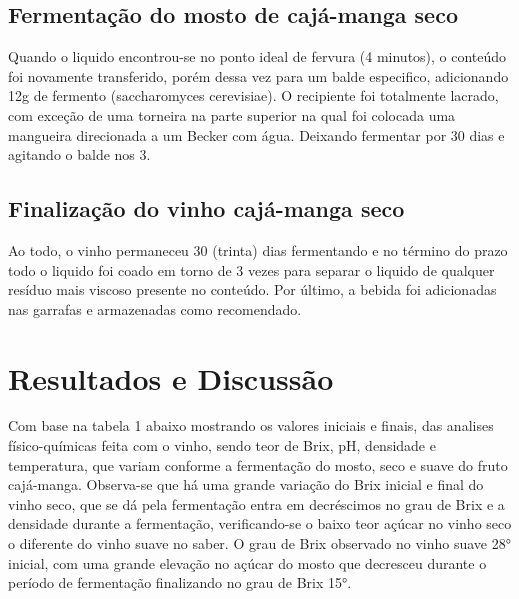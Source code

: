 \documentclass[article,12pt,onesidea,4paper,english,brazil]{abntex2}
\begin{document}
	\subsection*{Fermentação do mosto de cajá-manga seco}
	
	Quando o liquido encontrou-se no ponto ideal de fervura (4 minutos), o conteúdo foi novamente transferido, porém dessa vez para um balde especifico, adicionando 12g de fermento (saccharomyces cerevisiae). O recipiente foi totalmente lacrado, com exceção de uma torneira na parte superior na qual foi colocada uma mangueira direcionada a um Becker com água. Deixando fermentar por 30 dias e agitando o balde nos 3.
	
	\subsection*{Finalização do vinho cajá-manga seco}
	
	Ao todo, o vinho permaneceu 30 (trinta) dias fermentando e no término do prazo todo o liquido foi coado em torno de 3 vezes para separar o liquido de qualquer resíduo mais viscoso presente no conteúdo. Por último, a bebida foi adicionadas nas garrafas e armazenadas como recomendado.
	
	\section*{Resultados e Discussão}
	
Com base na tabela 1 abaixo mostrando os valores iniciais e finais, das analises físico-químicas feita com o vinho, sendo teor de Brix, pH, densidade e temperatura, que variam conforme a fermentação do mosto, seco e suave do fruto cajá-manga. Observa-se que há uma grande variação do Brix inicial e final do vinho seco, que se dá pela fermentação entra em decréscimos no grau de Brix e a densidade durante a fermentação, verificando-se o baixo teor açúcar no vinho seco o diferente do vinho suave no saber. O grau de Brix observado no vinho suave 28° inicial, com uma grande elevação no açúcar do mosto que decresceu durante o período de fermentação finalizando no grau de Brix 15°.
\end{document}
